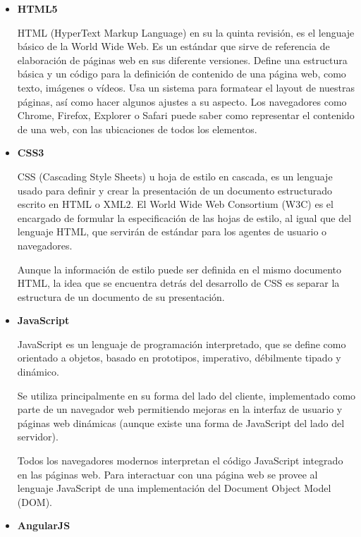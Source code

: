 \begin{itemize}
	\item \textbf{HTML5}
	
	HTML (HyperText Markup Language) \cite{html} en su la quinta revisión, es el lenguaje básico de la World Wide Web. Es un estándar que sirve de referencia de elaboración de páginas web en sus diferente versiones. Define una estructura básica y un código para la definición de contenido de una página web, como texto, imágenes o vídeos. Usa un sistema para formatear el layout de nuestras páginas, así como hacer algunos ajustes a su aspecto. Los navegadores como Chrome, Firefox, Explorer o Safari puede saber como representar el contenido de una web, con las ubicaciones de todos los elementos.
		
	\bigskip
	\item \textbf{CSS3}
		
	CSS (Cascading Style Sheets) \cite{css} u hoja de estilo en cascada, es un lenguaje usado para definir y crear la presentación de un documento estructurado escrito en HTML o XML2. El World Wide Web Consortium (W3C) es el encargado de formular la especificación de las hojas de estilo, al igual que del lenguaje HTML, que servirán de estándar para los agentes de usuario o navegadores.

	Aunque la información de estilo puede ser definida en el mismo documento HTML, la idea que se encuentra detrás del desarrollo de CSS es separar la estructura de un documento de su presentación. 

	\bigskip	
	\item \textbf{JavaScript}
		
	JavaScript \cite{js} es un lenguaje de programación interpretado, que se define como orientado a objetos, basado en prototipos, imperativo, débilmente tipado y dinámico.

	Se utiliza principalmente en su forma del lado del cliente, implementado como parte de un navegador web permitiendo mejoras en la interfaz de usuario y páginas web dinámicas (aunque existe una forma de JavaScript del lado del servidor). 

	Todos los navegadores modernos interpretan el código JavaScript integrado en las páginas web. Para interactuar con una página web se provee al lenguaje JavaScript de una implementación del Document Object Model (DOM).

	\bigskip \bigskip  %
	\bigskip		
	\item \textbf{AngularJS}
		

\end{itemize}
